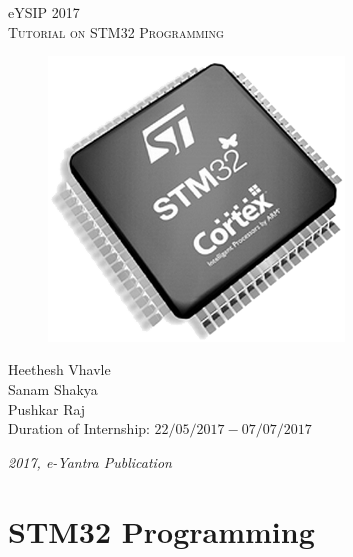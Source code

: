 \documentclass[a4paper,12pt,oneside]{book}
\begin{document}
\begin{titlepage}
\raggedright
{\Large eYSIP 2017\\[1cm]}
{\Huge \scshape Tutorial on STM32 Programming \\[.1in]}

\vfill

\begin{figure}[!htb]
\centering
\includegraphics[width=0.7\textwidth]{images/stm32}
\end{figure}

\vfill

\begin{flushright}
{\large Heethesh Vhavle \\}
{\large Sanam Shakya \\}
{\large Pushkar Raj \\}
\vspace{0.5cm}
{\large Duration of Internship: $ 22/05/2017-07/07/2017 $ \\}
\end{flushright}
\medskip

{\itshape 2017, e-Yantra Publication}
\end{titlepage}




\chapter[STM32 Programming]{STM32 Programming}
\end{document}

